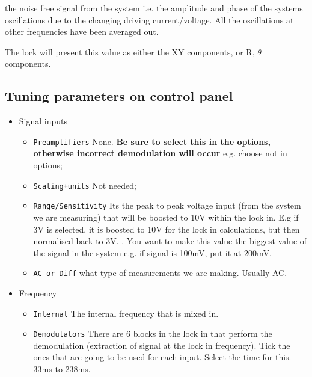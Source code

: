  \noindent the noise free signal from  the system i.e.  the amplitude and phase
  of the systems oscillations due  to the changing driving current/voltage.  All
  the oscillations at other frequencies have been averaged out.

  The lock  will present this  value as either  the XY components,  or R, $  \theta $
  components.

  \subsection{Tuning parameters on control panel}
  \begin{itemize}
  \item Signal inputs
    \begin{itemize}
    \item \texttt{Preamplifiers} {\ira None.  \textbf{Be  sure to select this in
          the options, otherwise incorrect demodulation will occur} e.g.  choose
         not  in options;}
    \item \texttt{Scaling+units} {\ira Not needed;}
    \item \texttt{Range/Sensitivity}  \ira Its  the peak  to peak  voltage input
      (from the system we are measuring) that  will be boosted to 10V within the
      lock in.  E.g if  3V is selected,  it is  boosted to 10V  for the  lock in
      calculations, but then normalised back to  3V. .  You want to make this value the biggest value
      of the signal in the system e.g.  if signal is 100mV, put it at 200mV.
    \item  \texttt{AC   or  Diff}  \ira   what  type  of  measurements   we  are
      making. Usually AC.
    \end{itemize}
  \item Frequency
    \begin{itemize}
    \item  \texttt{Internal}   \ira  The   internal  frequency  that   is  mixed
      in. 
    \item \texttt{Demodulators}  \ira There  are 6  blocks in  the lock  in that
      perform  the   demodulation  (extraction   of  signal   at  the   lock  in
      frequency).  Tick the  ones that  are  going to  be used  for each  input.
      Select the time for this.  {33ms to 238ms.}  


\end{itemize}
\end{itemize}
